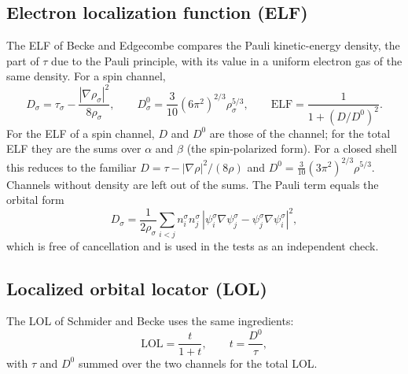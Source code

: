 \documentclass[11pt,a4paper]{article}
\begin{document}
\subsection{Electron localization function (ELF)}
The ELF of Becke and Edgecombe compares the Pauli kinetic-energy density,
the part of $\tau$ due to the Pauli principle, with its value in a uniform
electron gas of the same density. For a spin channel,
\begin{equation}
 D_\sigma=\tau_\sigma-\frac{|\nabla\rho_\sigma|^2}{8\rho_\sigma},\qquad
 D^0_\sigma=\frac{3}{10}(6\pi^2)^{2/3}\rho_\sigma^{5/3},\qquad
 \mathrm{ELF}=\frac{1}{1+(D/D^0)^2}.
\end{equation}
For the ELF of a spin channel, $D$ and $D^0$ are those of the channel; for
the total ELF they are the sums over $\alpha$ and $\beta$ (the
spin-polarized form). For a closed shell this reduces to the familiar
$D=\tau-|\nabla\rho|^2/(8\rho)$ and $D^0=\frac{3}{10}(3\pi^2)^{2/3}\rho^{5/3}$.
Channels without density are left out of the sums. The Pauli term equals
the orbital form
\begin{equation}
 D_\sigma=\frac{1}{2\rho_\sigma}\sum_{i<j}
 n_i^\sigma n_j^\sigma\,|\psi_i^\sigma\nabla\psi_j^\sigma-\psi_j^\sigma\nabla\psi_i^\sigma|^2,
\end{equation}
which is free of cancellation and is used in the tests as an independent
check.

\subsection{Localized orbital locator (LOL)}
The LOL of Schmider and Becke uses the same ingredients:
\begin{equation}
 \mathrm{LOL}=\frac{t}{1+t},\qquad t=\frac{D^0}{\tau},
\end{equation}
with $\tau$ and $D^0$ summed over the two channels for the total LOL.
\end{document}
